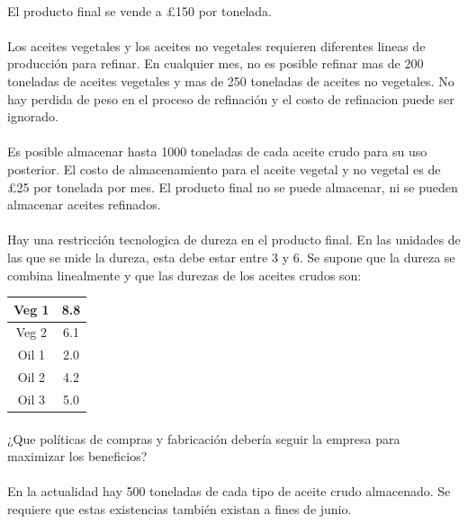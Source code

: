 \paragraph{}El producto final se vende a \pounds 150 por tonelada.
\paragraph{}Los aceites vegetales y los aceites no vegetales requieren diferentes lineas de producción para refinar. En cualquier mes, no es posible refinar mas de 200 toneladas de aceites vegetales y mas de 250 toneladas de aceites no vegetales. No hay perdida de peso en el proceso de refinación y el costo de refinacion puede ser ignorado.
\paragraph{}Es posible almacenar hasta 1000 toneladas de cada aceite crudo para su uso posterior. El costo de almacenamiento para el aceite vegetal y no vegetal es de \pounds 25 por tonelada por mes. El producto final no se puede almacenar, ni se pueden almacenar aceites refinados.
\paragraph{}Hay una restricción tecnologica de dureza en el producto final. En las unidades de las que se mide la dureza, esta debe estar entre 3 y 6. Se supone que la dureza se combina linealmente y que las durezas de los aceites crudos son:\\
\begin{center}
\begin{tabular}{|c|c|}
\hline 
Veg 1 & 8.8 \\ 
\hline 
Veg 2 & 6.1 \\ 
\hline 
Oil 1 & 2.0 \\ 
\hline 
Oil 2 & 4.2 \\ 
\hline 
Oil 3 & 5.0 \\ 
\hline 
\end{tabular} 
\end{center}

\paragraph{}¿Que políticas de compras y fabricación debería seguir la empresa para maximizar los beneficios?  
\paragraph{}En la actualidad hay 500 toneladas de cada tipo de aceite crudo almacenado. Se requiere que estas existencias también existan a fines de junio.

